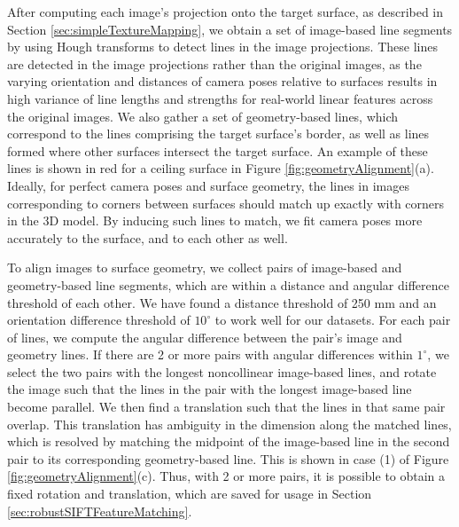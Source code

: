 \documentclass[]{spie}  %
\begin{document}
After computing each image's projection onto the target surface, as
described in Section \ref{sec:simpleTextureMapping}, we obtain a set
of image-based line segments by using Hough transforms to detect lines
in the image projections. These lines are detected in the image
projections rather than the original images, as the varying
orientation and distances of camera poses relative to surfaces results
in high variance of line lengths and strengths for real-world linear
features across the original images. We also gather a set of
geometry-based lines, which correspond to the lines comprising the
target surface's border, as well as lines formed where other surfaces
intersect the target surface. An example of these lines is shown in
red for a ceiling surface in Figure
\ref{fig:geometryAlignment}(a). Ideally, for perfect camera poses and
surface geometry, the lines in images corresponding to corners between
surfaces should match up exactly with corners in the 3D model. By
inducing such lines to match, we fit camera poses more accurately to
the surface, and to each other as well.

To align images to surface geometry, we collect pairs of image-based
and geometry-based line segments, which are within a distance and
angular difference threshold of each other. We have found a distance
threshold of 250 mm and an orientation difference threshold of
$10^\circ$ to work well for our datasets. For each pair of lines, we
compute the angular difference between the pair's image and geometry
lines. If there are 2 or more pairs with angular differences within
$1^\circ$, we select the two pairs with the longest noncollinear
image-based lines, and rotate the image such that the lines in the
pair with the longest image-based line become parallel. We then find a
translation such that the lines in that same pair overlap. This
translation has ambiguity in the dimension along the matched lines,
which is resolved by matching the midpoint of the image-based line in
the second pair to its corresponding geometry-based line. This is
shown in case (1) of Figure \ref{fig:geometryAlignment}(c). Thus, with
2 or more pairs, it is possible to obtain a fixed rotation and
translation, which are saved for usage in Section
\ref{sec:robustSIFTFeatureMatching}.
\end{document}
